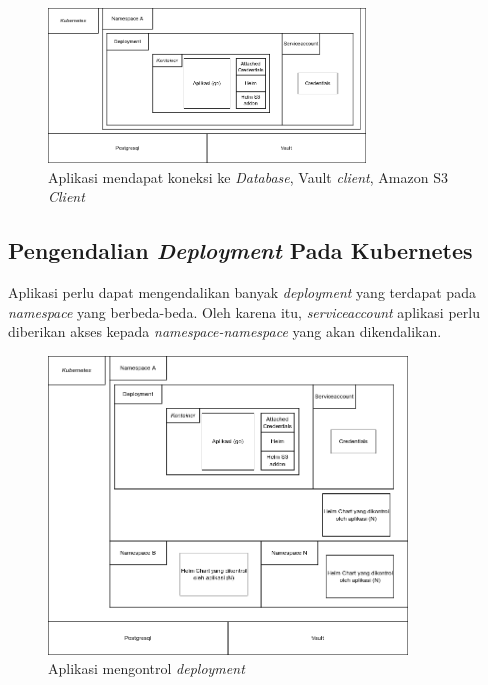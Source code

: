 \begin{figure}
	\centering
	\includegraphics[width=0.75\textwidth]{pics/AplikasiMendapatCredentials.png}
	\caption{Aplikasi mendapat koneksi ke \textit{Database}, Vault \textit{client}, Amazon S3 \textit{Client}}
	\label{fig:aplikasiMendapatCredentials}
\end{figure}


\newpage

\subsection{Pengendalian \textit{Deployment} Pada Kubernetes}

Aplikasi perlu dapat mengendalikan banyak \textit{deployment} yang terdapat pada \textit{namespace} yang berbeda-beda. Oleh karena itu, \textit{serviceaccount} aplikasi perlu diberikan akses kepada \textit{namespace-namespace} yang akan dikendalikan.

\begin{figure}
	\centering
	\includegraphics[width=0.85\textwidth]{pics/AplikasiMengontrolDeployment.png}
	\caption{Aplikasi mengontrol \textit{deployment}}
	\label{fig:aplikasiMengontrolDeployment}
\end{figure}

